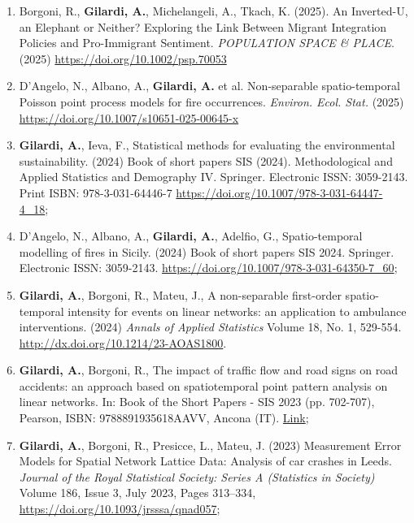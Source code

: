 \documentclass[11pt,a4paper,sans]{moderncv}
\begin{document}
  \begin{enumerate}
  \item Borgoni, R., \textbf{Gilardi, A.}, Michelangeli, A., Tkach, K. (2025). An Inverted-U, an Elephant or Neither? Exploring the Link Between Migrant Integration Policies and Pro-Immigrant Sentiment. \emph{POPULATION SPACE \& PLACE}. (2025) \url{https://doi.org/10.1002/psp.70053}
  \item D’Angelo, N., Albano, A., \textbf{Gilardi, A.} et al. Non-separable spatio-temporal Poisson point process models for fire occurrences. \emph{Environ. Ecol. Stat.} (2025) \url{https://doi.org/10.1007/s10651-025-00645-x}
  \item \textbf{Gilardi, A.}, Ieva, F., Statistical methods for evaluating the environmental sustainability. (2024) Book of short papers SIS (2024). Methodological and Applied Statistics and Demography IV. Springer. Electronic ISSN: 3059-2143. Print ISBN: 978-3-031-64446-7 \url{https://doi.org/10.1007/978-3-031-64447-4_18}; 
  \item D'Angelo, N., Albano, A., \textbf{Gilardi, A.}, Adelfio, G., Spatio-temporal modelling of fires in Sicily. (2024) Book of short papers SIS 2024. Springer. Electronic ISSN: 3059-2143. \url{https://doi.org/10.1007/978-3-031-64350-7_60}; 
  \item \textbf{Gilardi, A.}, Borgoni, R., Mateu, J., A non-separable first-order spatio-temporal intensity for events on linear networks: an application to ambulance interventions. (2024) \textit{Annals of Applied Statistics} Volume 18, No. 1, 529-554. \url{http://dx.doi.org/10.1214/23-AOAS1800}.
  \item \textbf{Gilardi, A.}, Borgoni, R., The impact of traffic flow and road signs on road accidents: an approach based on spatiotemporal point pattern analysis on linear networks. In: Book of the Short Papers - SIS 2023 (pp. 702-707), Pearson, ISBN: 9788891935618AAVV, Ancona (IT). \href{https://it.pearson.com/content/dam/region-core/italy/pearson-italy/pdf/Docenti/Universit%C3%A0/bozza-book-compresso.pdf}{Link};  
  \item \textbf{Gilardi, A.}, Borgoni, R., Presicce, L., Mateu, J. (2023) Measurement Error Models for Spatial Network Lattice Data: Analysis of car crashes in Leeds. \textit{Journal of the Royal Statistical Society: Series A (Statistics in Society)} Volume 186, Issue 3, July 2023, Pages 313–334, \url{https://doi.org/10.1093/jrsssa/qnad057};

\end{enumerate}
\end{document}
